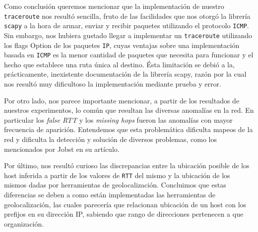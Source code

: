 Como conclusión queremos mencionar que la implementación de nuestro \texttt{traceroute} nos resultó sencilla, fruto de las facilidades que nos otorgó la librería \texttt{scapy} a la hora de armar, enviar y recibir paquetes utilizando el protocolo \texttt{ICMP}. Sin embargo, nos hubiera gustado llegar a implementar un \texttt{traceroute} utilizando los flags Option de los paquetes \texttt{IP}, cuyas ventajas sobre una implementación basada en \texttt{ICMP} es la menor cantidad de paquetes que necesita para funcionar y el hecho que establece una ruta única al destino. Ésta limitación se debió a la, prácticamente, inexistente documentación de la librería scapy, razón por la cual nos resultó muy dificultoso la implementación mediante prueba y error.

Por otro lado, nos parece importante mencionar, a partir de los resultados de nuestros experimentos, lo común que resultan las diversas anomalías en la red. En particular los \textit{false RTT} y los \textit{missing hops} fueron las anomalías con mayor frecuencia de aparición. Entendemos que esta problemática dificulta mapeos de la red y dificulta la detección y solución de diversos problemas, como los mencionados por Jobst en su artículo\cite{Jobst}.

Por último, nos resultó curioso las discrepancias entre la ubicación posible de los host inferida a partir de los valores de \texttt{RTT} del mismo y la ubicación de los mismos dadas por herramientas de geolocalización. Concluimos que estas diferencias se deben a como están implementadas las herramientas de geolocalización, las cuales parecería que relacionan ubicación de un host con los prefijos en su dirección IP, sabiendo que rango de direcciones pertenecen a que organización.

